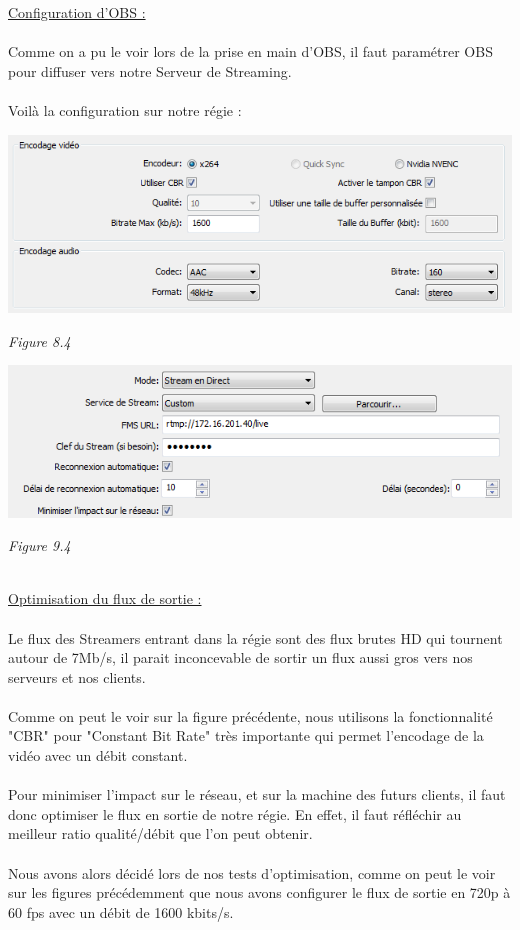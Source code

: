 \documentclass{report}
\begin{document}
    \underline{Configuration d’OBS :}
    \\
    \\
    Comme on a pu le voir lors de la prise en main d’OBS, il faut paramétrer OBS pour diffuser vers notre Serveur de Streaming. 
    \\
    \\
    Voilà la configuration sur notre régie :
    \\
        \begin{center}
    \includegraphics[width=16cm]{img/obs1.png}
    
    \textit{\small{Figure 8.4}}
    \end{center}
    
    \hfill
    
        \begin{center}
    \includegraphics[width=16cm]{img/obs.png}
    
    \textit{\small{Figure 9.4}}
    \end{center}
    
    
    \\
    
    \underline{Optimisation du flux de sortie :}
    \\
    \\
    Le flux des Streamers entrant dans la régie sont des flux brutes HD qui tournent autour de 7Mb/s, il parait inconcevable de sortir un flux aussi gros vers nos serveurs et nos clients.
    \\
    \\
    Comme on peut le voir sur la figure précédente, nous utilisons la fonctionnalité "CBR" pour "Constant Bit Rate" très importante qui permet l'encodage de la vidéo avec un débit constant.
    \\
    \\
    Pour minimiser l’impact sur le réseau, et sur la machine des futurs clients, il faut donc optimiser le flux en sortie de notre régie. En effet, il faut réfléchir au meilleur ratio qualité/débit que l’on peut obtenir.
    \\
    \\
    Nous avons alors décidé lors de nos tests d’optimisation, comme on peut le voir sur les figures précédemment que nous avons configurer le flux de sortie en 720p à 60 fps avec un débit de 1600 kbits/s.
    
\end{document}
